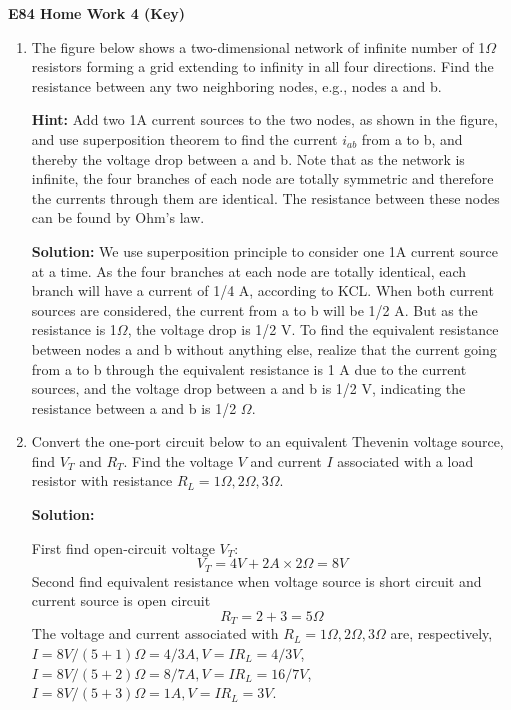 \usepackage{html}

\begin{center}
{\Large \bf E84 Home Work 4 (Key)}
\end{center}
\begin{enumerate}

\item The figure below shows a two-dimensional network of infinite number 
of 1$\Omega$ resistors forming a grid extending to infinity in all four 
directions. Find the resistance between any two neighboring nodes, e.g., 
nodes a and b.


{\bf Hint:} Add two 1A current sources to the two nodes, as shown in the 
figure, and use superposition theorem to find the current $i_{ab}$ from 
a to b, and thereby the voltage drop between a and b. Note that as the
network is infinite, the four branches of each node are totally symmetric
and therefore the currents through them are identical. The resistance 
between these nodes can be found by Ohm's law.

{\bf Solution:}
We use superposition principle to consider one 1A current source at a time.
As the four branches at each node are totally identical, each branch will
have a current of 1/4 A, according to KCL. When both current sources are
considered, the current from a to b will be 1/2 A. But as the resistance
is 1$\Omega$, the voltage drop is 1/2 V. To find the equivalent resistance
between nodes a and b without anything else, realize that the current going
from a to b through the equivalent resistance is 1 A due to the current 
sources, and the voltage drop between a and b is 1/2 V, indicating the 
resistance between a and b is 1/2 $\Omega$.

\item Convert the one-port circuit below to an equivalent Thevenin voltage
source, find $V_T$ and $R_T$. Find the voltage $V$ and current $I$ associated
with a load resistor with resistance $R_L=1\Omega, 2\Omega, 3\Omega$.


{\bf Solution:}

First find open-circuit voltage $V_T$:
\[ V_T=4V+2A \times 2\Omega = 8V \]
Second find equivalent resistance when voltage source is short circuit
and current source is open circuit
\[ R_T=2+3=5\Omega \]
The voltage and current associated with $R_L=1\Omega, 2\Omega, 3\Omega$ are, 
respectively, 
$I=8V/(5+1)\Omega=4/3A, V=IR_L=4/3V$, 
$I=8V/(5+2)\Omega=8/7A, V=IR_L=16/7V$, 
$I=8V/(5+3)\Omega=1A, V=IR_L=3V$.


\end{enumerate}
